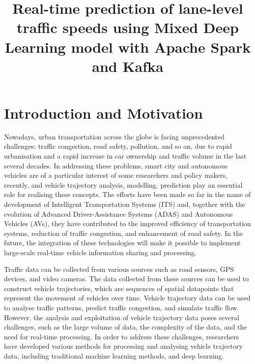 \documentclass{article}
\title{Real-time prediction of lane-level traffic speeds using Mixed Deep Learning model with Apache Spark and Kafka}
\begin{document}
%
\maketitle
%
\section{Introduction and Motivation}
\label{sec:intro} %
Nowadays, urban transportation across the globe is facing unprecedented challenges: traffic congestion, road safety, pollution, and so on, due to rapid urbanisation and a rapid increase in car ownership and traffic volume in the last several decades. In addressing these problems, smart city and autonomous vehicles are of a particular interest of some researchers and policy makers, recently, and vehicle trajectory analysis, modelling, prediction play an essential role for realising these concepts. The efforts have been made so far in the name of development of Intelligent Transportation Systems (ITS) and, together with the evolution of Advanced Driver-Assistance Systems (ADAS) and Autonomous Vehicles (AVs), they have contributed to the improved efficiency of transportation systems, reduction of traffic congestion, and enhancement of road safety. In the future, the integration of these technologies will make it possible to implement large-scale real-time vehicle information sharing and processing. 

Traffic data can be collected from various sources such as road sensors, GPS devices, and video cameras. The data collected from these sources can be used to construct vehicle trajectories, which are sequences of spatial datapoints that represent the movement of vehicles over time. Vehicle trajectory data can be used to analyse traffic patterns, predict traffic congestion, and simulate traffic flow. However, the analysis and exploitation of vehicle trajectory data poses several challenges, such as the large volume of data, the complexity of the data, and the need for real-time processing. In order to address these challenges, researchers have developed various methods for processing and analysing vehicle trajectory data, including traditional machine learning methods, and deep learning. 
\end{document}
